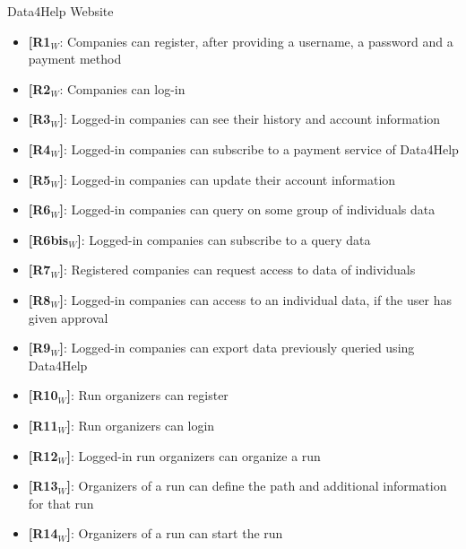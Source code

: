 \noindent Data4Help Website
\begin{itemize}
    \item \textbf{[R1$_W$}: Companies can register, after providing a username, a password and a payment method
    \item \textbf{[R2$_W$}: Companies can log-in
    \item \textbf{[R3$_W$]}: Logged-in companies can see their history and account information
    \item \textbf{[R4$_W$]}: Logged-in companies can subscribe to a payment service of Data4Help
    \item \textbf{[R5$_W$]}: Logged-in companies can update their account information
    \item \textbf{[R6$_W$]}: Logged-in companies can query on some group of individuals data
    \item \textbf{[R6bis$_W$]}: Logged-in companies can subscribe to a query data
    \item \textbf{[R7$_W$]}: Registered companies can request access to data of individuals
    \item \textbf{[R8$_W$]}: Logged-in companies can access to an individual data, if the user has given approval
    \item \textbf{[R9$_W$]}: Logged-in companies can export data previously queried using Data4Help
    
    \item \textbf{[R10$_W$]}: Run organizers can register
    \item \textbf{[R11$_W$]}: Run organizers can login
    \item \textbf{[R12$_W$]}: Logged-in run organizers can organize a run
    \item \textbf{[R13$_W$]}: Organizers of a run can define the path and additional information for that run
    \item \textbf{[R14$_W$]}: Organizers of a run can start the run
    
\end{itemize}

